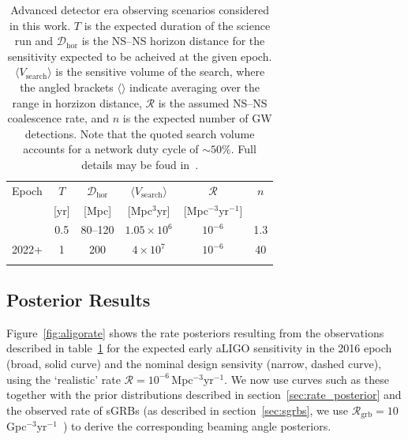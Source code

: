 \documentclass[twocolumn,nofootinbib]{revtex4-1}
\newcommand{\grbrate}{{{\mathcal R}_{\mathrm{grb}}}}
\newcommand{\cbcrate}{{{\mathcal R}}}
\newcommand{\dhor}{{\mathcal D}_{\mathrm{hor}}}
\newcommand{\BNS}{\ac{NS}--\ac{NS}\xspace}
\begin{document}
%
\begin{table}
\centering
\begin{tabular}{l c c c c c }
\toprule
Epoch & $T$ & $\dhor$ &
$\langle V_{\mathrm{search}}\rangle$ & $\cbcrate$ & $n$ \\
 & [yr] & [Mpc] & [Mpc$^3$yr] &  [Mpc$^{-3}$yr$^{-1}$] \\
\colrule
2016 & 0.5 & 80--120 & $1.05\times10^6$ & $10^{-6}$ & 1.3 \\
2022+ & 1 & 200 & $4\times10^7$ & $10^{-6}$ & 40 \\
\botrule
\end{tabular}
\caption{Advanced detector era observing scenarios considered in this work.
    $T$ is the expected duration of the science run and $\dhor$ is the \BNS horizon distance for the sensitivity expected to be acheived at the given epoch.
$\langle V_{\mathrm{search}}\rangle $ is the sensitive volume of the search, where the angled brackets $\langle \rangle$ indicate averaging over the range in horzizon distance, $\cbcrate$ is the assumed \BNS coalescence rate, and $n$ is the expected number of \ac{GW} detections.
    Note that the quoted search volume accounts for a network duty cycle of $\sim 50\%$.
    Full details may be foud in~\cite{Aasi:2013wya}.
    \label{table:scenarios}}
\end{table}
%

\subsection{Posterior Results}
Figure~\ref{fig:aligorate} shows the rate posteriors resulting from the observations described in table~\ref{table:scenarios} for the expected early \ac{aLIGO} sensitivity in the 2016 epoch (broad, solid curve) and the nominal design sensivity (narrow, dashed curve), using the `realistic' rate $\cbcrate=10^{-6}$\,Mpc$^{-3}$yr$^{-1}$.
We now use curves such as these together with the prior distributions described in section~\ref{sec:rate_posterior} and the observed rate of \acp{sGRB} (as described in section~\ref{sec:sgrbs}, we use $\grbrate=10$\,Gpc$^{-3}$yr$^{-1}$~\cite{Nakar:2007yr,Dietz:2010eh}) to derive the corresponding beaming angle posteriors.
\end{document}
